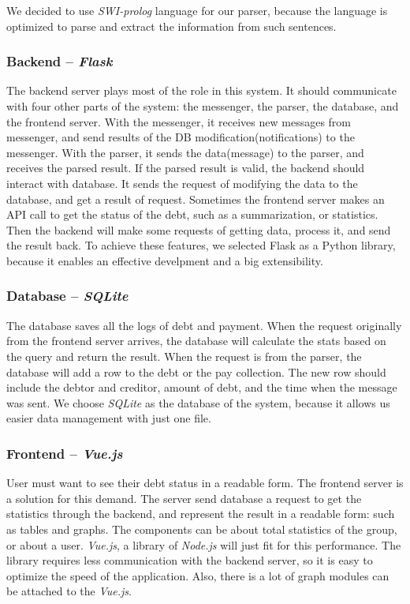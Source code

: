 \documentclass[11pt]{article}
\begin{document}
We decided to use \textit{SWI-prolog} language for our parser,
because the language is optimized to parse and extract the information
from such sentences.

\subsubsection{Backend -- \textit{Flask}}
The backend server plays most of the role in this system.
It should communicate with four other parts of the system:
the messenger, the parser, the database, and the frontend server.
With the messenger, it receives new messages from messenger,
and send results of the DB modification(notifications) to the messenger.
With the parser, it sends the data(message) to the parser,
and receives the parsed result.
If the parsed result is valid, the backend should interact with database.
It sends the request of modifying the data to the database,
and get a result of request.
Sometimes the frontend server makes an API call to get the status of the debt,
such as a summarization, or statistics.
Then the backend will make some requests of getting data, process it, and send the result back.
To achieve these features, we selected Flask as a Python library,
because it enables an effective develpment and a big extensibility.

\subsubsection{Database -- \textit{SQLite}}
The database saves all the logs of debt and payment.
When the request originally from the frontend server arrives, the database
will calculate the stats based on the query and return the result.
When the request is from the parser, the database will add a row to the
debt or the pay collection.
The new row should include the debtor and creditor, amount of debt,
and the time when the message was sent.
We choose \textit{SQLite} as the database of the system,
because it allows us easier data management with just one file.

\subsubsection{Frontend -- \textit{Vue.js}}
User must want to see their debt status in a readable form.
The frontend server is a solution for this demand.
The server send database a request to get the statistics through the backend,
and represent the result in a readable form: such as tables and graphs.
The components can be about total statistics of the group, or about a user.
\textit{Vue.js}, a library of \textit{Node.js} will just fit for this performance.
The library requires less communication with the backend server,
so it is easy to optimize the speed of the application.
Also, there is a lot of graph modules can be attached to the \textit{Vue.js}.
\end{document}
